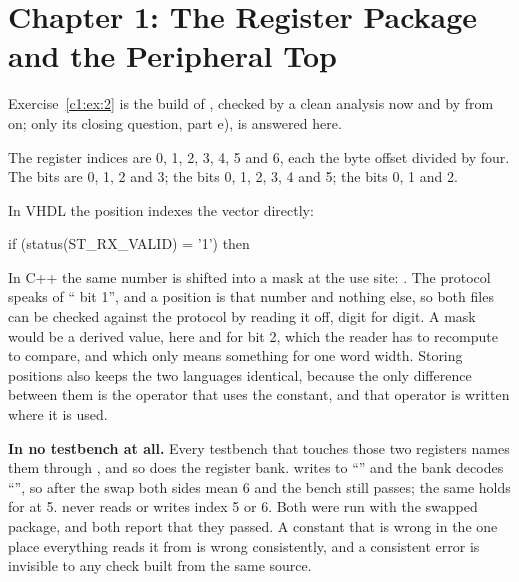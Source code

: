 
\section{Chapter 1: The Register Package and the Peripheral Top}
\label{sol:c1}
Exercise~\ref{c1:ex:2} is the build of , checked by a clean analysis now and by
 from  on; only its closing question, part e), is answered here.

 The register indices are  0,  1,  2,
 3,  4,  5 and  6, each the
byte offset divided by four. The  bits are  0,  1,
 2 and  3; the  bits  0,
 1,  2,  3,  4 and
 5; the  bits  0,  1 and
 2.

 In VHDL the position indexes the vector directly:

\begin{vhdlcode}
if (status(ST_RX_VALID) = '1') then
\end{vhdlcode}

\noindent In C++ the same number is shifted into a mask at the use site:
. The protocol speaks of `` bit 1'',
and a position is that number and nothing else, so both files can be checked against the protocol
by reading it off, digit for digit. A mask would be a derived value,  here and  for
bit 2, which the reader has to recompute to compare, and which only means something for one word
width. Storing positions also keeps the two languages identical, because the only difference between
them is the operator that uses the constant, and that operator is written where it is used.

 \textbf{In no testbench at all.} Every testbench that touches those two registers names them
through , and so does the register bank.  writes  to
``'' and the bank decodes ``'', so after the swap both sides mean
6 and the bench still passes; the same holds for  at 5.  never
reads or writes index 5 or 6. Both were run with the swapped package, and both report that they
passed. A constant that is wrong in the one place everything reads it from is wrong consistently,
and a consistent error is invisible to any check built from the same source.

